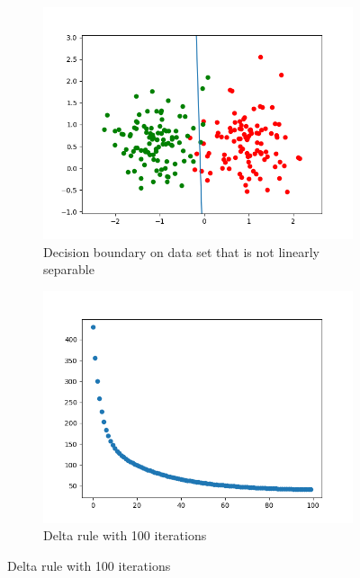 \documentclass[a4paper]{article}
\begin{document}
\begin{figure}[htb]
    \centering
    \begin{subfigure}{0.4\textwidth}
        \includegraphics[width=\textwidth]{Labs/Lab 1/Lab 1a/Results/decicion-boundary-not-separable.png}
        \caption{Decision boundary on data set that is not linearly separable}
        \label{fig:Decision-boundary-not-linearly-separable}
    \end{subfigure}
    \hfill
    \begin{subfigure}{0.4\textwidth}
        \includegraphics[width=\textwidth]{Labs/Lab 1/Lab 1a/Results/error-convergance.png}
        \caption{Delta rule with 100 iterations}
        \label{fig:Error-convergance}
    \end{subfigure}
\end{figure}
\end{document}
